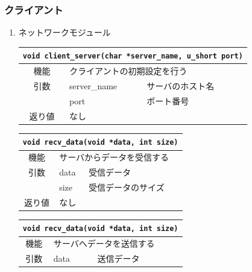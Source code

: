 \documentclass{jarticle}
\begin{document}
\subsubsection{クライアント}
\begin{enumerate}
  \item ネットワークモジュール
      \begin{table}[H]
        \begin{center}
          \begin{tabular}{|c|p{6em}p{27em}|} \hline
            \multicolumn{3}{|l|}{{\tt void client\_server(char *server\_name, u\_short port)}}\\ \hline \hline
            機能 & \multicolumn{2}{|l|}{クライアントの初期設定を行う}\\
            引数 & server\_name & サーバのホスト名\\
            & port & ポート番号\\
            返り値 & なし & \\ \hline
          \end{tabular}
        \end{center}
      \end{table}
%
      \begin{table}[H]
        \begin{center}
          \begin{tabular}{|c|p{3em}p{30em}|} \hline
            \multicolumn{3}{|l|}{{\tt void recv\_data(void *data, int size)}}\\ \hline \hline
            機能 & \multicolumn{2}{|l|}{サーバからデータを受信する}\\
            引数 & data & 受信データ\\
            & size & 受信データのサイズ\\
            返り値 &なし & \\ \hline
          \end{tabular}
        \end{center}
      \end{table}
%
      \begin{table}[H]
        \begin{center}
          \begin{tabular}{|c|p{3em}p{30em}|} \hline
            \multicolumn{3}{|l|}{{\tt void recv\_data(void *data, int size)}} \\ \hline \hline
            機能 & \multicolumn{2}{|l|}{サーバへデータを送信する}\\
            引数 & data & 送信データ\\

\end{tabular}
\end{center}
\end{table}
\end{enumerate}
\end{document}
